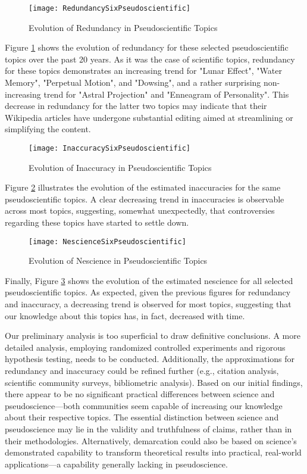 \begin{figure}[H]
\centering\texttt{[image: RedundancySixPseudoscientific]}
\caption{\label{fig:redundancy_six_pseudoscientific}Evolution of Redundancy in Pseudoscientific Topics}
\end{figure}

Figure \ref{fig:redundancy_six_pseudoscientific} shows the evolution of redundancy for these selected pseudoscientific topics over the past 20 years. As it was the case of scientific topics, redundancy for these topics demonstrates an increasing trend for "Lunar Effect", "Water Memory", "Perpetual Motion", and "Dowsing", and a rather surprising non-increasing trend for "Astral Projection" and "Enneagram of Personality". This decrease in redundancy for the latter two topics may indicate that their Wikipedia articles have undergone substantial editing aimed at streamlining or simplifying the content.

\begin{figure}[H]
\centering\texttt{[image: InaccuracySixPseudoscientific]}
\caption{\label{fig:inaccuracy_six_pseudoscientific}Evolution of Inaccuracy in Pseudoscientific Topics}
\end{figure}

Figure \ref{fig:inaccuracy_six_pseudoscientific} illustrates the evolution of the estimated inaccuracies for the same pseudoscientific topics. A clear decreasing trend in inaccuracies is observable across most topics, suggesting, somewhat unexpectedly, that controversies regarding these topics have started to settle down. 

\begin{figure}[H]
\centering\texttt{[image: NescienceSixPseudoscientific]}
\caption{\label{fig:nescience_six_pseudoscientific}Evolution of Nescience in Pseudoscientific Topics}
\end{figure}

Finally, Figure \ref{fig:nescience_six_pseudoscientific} shows the evolution of the estimated nescience for all selected pseudoscientific topics. As expected, given the previous figures for redundancy and inaccuracy, a decreasing trend is observed for most topics, suggesting that our knowledge about this topics has, in fact, decreased with time.

Our preliminary analysis is too superficial to draw definitive conclusions. A more detailed analysis, employing randomized controlled experiments and rigorous hypothesis testing, needs to be conducted. Additionally, the approximations for redundancy and inaccuracy could be refined further (e.g., citation analysis, scientific community surveys, bibliometric analysis). Based on our initial findings, there appear to be no significant practical differences between science and pseudoscience—both communities seem capable of increasing our knowledge about their respective topics. The essential distinction between science and pseudoscience may lie in the validity and truthfulness of claims, rather than in their methodologies. Alternatively, demarcation could also be based on science's demonstrated capability to transform theoretical results into practical, real-world applications—a capability generally lacking in pseudoscience.

